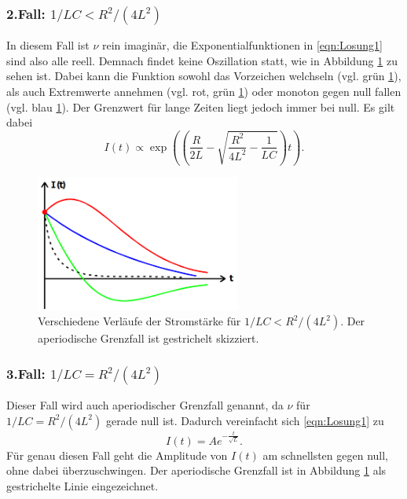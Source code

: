 \subsubsection*{2.Fall: $1/LC<R^2/(4L^2)$}
In diesem Fall ist $\nu$ rein imaginär, die Exponentialfunktionen in \eqref{eqn:Losung1} sind also alle reell. Demnach findet keine Oszillation
statt, wie in Abbildung \ref{fig:Fall2} zu sehen ist. Dabei kann die Funktion sowohl das Vorzeichen welchseln (vgl. grün \ref{fig:Fall2}), als
auch Extremwerte annehmen (vgl. rot, grün \ref{fig:Fall2}) oder monoton gegen null fallen (vgl. blau \ref{fig:Fall2}). Der Grenzwert für lange
Zeiten liegt jedoch immer bei null. Es gilt dabei
\begin{equation*}
    I(t)\propto \exp\left(\left(\frac{R}{2L}-\sqrt{\frac{R^2}{4L^2}-\frac{1}{LC}}\right)t\right)    .
\end{equation*}
\begin{figure}[H]
    \centering
    \includegraphics[width=0.6\textwidth]{pictures/Fall2.png}
    \caption{Verschiedene Verläufe der Stromstärke für $1/LC<R^2/(4L^2)$. Der aperiodische Grenzfall ist gestrichelt skizziert.\cite{AP01}}
    \label{fig:Fall2}
\end{figure}

\subsubsection*{3.Fall: $1/LC=R^2/(4L^2)$}
\label{sec:Fall3}
Dieser Fall wird auch aperiodischer Grenzfall genannt, da $\nu$ für $1/LC=R^2/(4L^2)$ gerade null ist. Dadurch vereinfacht sich \eqref{eqn:Losung1}
zu
\begin{equation*}
    I(t)=Ae^{-\frac{t}{\sqrt{L}}}   .
\end{equation*}
Für genau diesen Fall geht die Amplitude von $I(t)$ am schnellsten gegen null, ohne dabei überzuschwingen. Der aperiodische Grenzfall ist in
Abbildung \ref{fig:Fall2} als gestrichelte Linie eingezeichnet.

